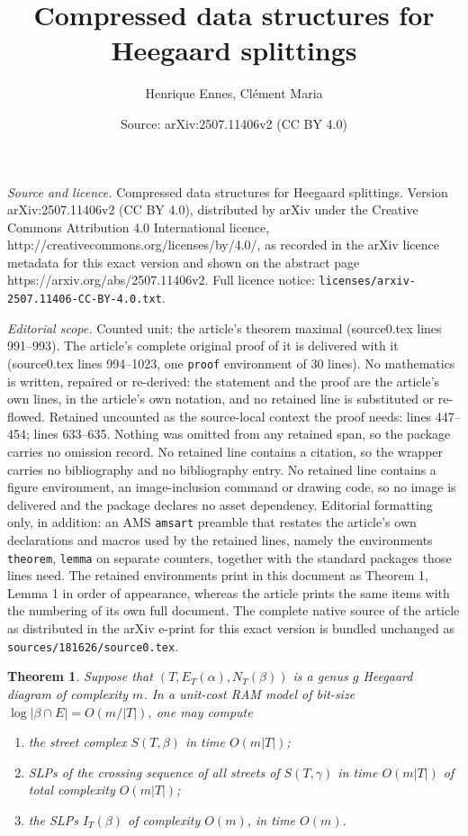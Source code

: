 \documentclass[10pt,a4paper]{amsart}
\title{Compressed data structures for Heegaard splittings}
\author{Henrique Ennes, Cl\'ement Maria}
\date{Source: arXiv:2507.11406v2 (CC BY 4.0)}
\newtheorem{theorem}{Theorem}
\begin{document}
\maketitle

\noindent\emph{Source and licence.} Compressed data structures for Heegaard splittings. Version arXiv:2507.11406v2 (CC BY 4.0), distributed by arXiv under the Creative Commons Attribution 4.0 International licence, http://creativecommons.org/licenses/by/4.0/, as recorded in the arXiv licence metadata for this exact version and shown on the abstract page https://arxiv.org/abs/2507.11406v2. Full licence notice: \texttt{licenses/arxiv-2507.11406-CC-BY-4.0.txt}.\par\smallskip

\noindent\textit{Editorial scope.} Counted unit: the article's theorem maximal (source0.tex lines 991--993). The article's complete original proof of it is delivered with it (source0.tex lines 994--1023, one \texttt{proof} environment of 30 lines). No mathematics is written, repaired or re-derived: the statement and the proof are the article's own lines, in the article's own notation, and no retained line is substituted or re-flowed.  Retained uncounted as the source-local context the proof needs: lines 447--454; lines 633--635.  Nothing was omitted from any retained span, so the package carries no omission record.  No retained line contains a citation, so the wrapper carries no bibliography and no bibliography entry.  No retained line contains a figure environment, an image-inclusion command or drawing code, so no image is delivered and the package declares no asset dependency.  Editorial formatting only, in addition: an AMS \texttt{amsart} preamble that restates the article's own declarations and macros used by the retained lines, namely the environments \texttt{theorem}, \texttt{lemma} on separate counters, together with the standard packages those lines need.  The retained environments print in this document as Theorem 1, Lemma 1 in order of appearance, whereas the article prints the same items with the numbering of its own full document.  The complete native source of the article as distributed in the arXiv e-print for this exact version is bundled unchanged as \texttt{sources/181626/source0.tex}.
\begin{theorem}\label{th: erickson}
        Suppose that $(T,E_T(\alpha),N_T(\beta))$ is a genus $g$ Heegaard diagram of complexity $m$. In a unit-cost RAM model of bit-size $\log |\beta\cap E|=O(m/|T|)$, one may compute 
        \begin{enumerate}[label=(\alph*)]
            \item the street complex $S(T,\beta)$ in time $O(m|T|)$;
            \item SLPs of the crossing sequence of all streets of $S(T,\gamma)$ in time $O(m|T|)$ of \emph{total} complexity $O(m|T|)$;
             \item the SLPs $I_T(\beta)$ of complexity $O(m)$, in time $O(m)$.
        \end{enumerate}
\end{theorem}
\end{document}
